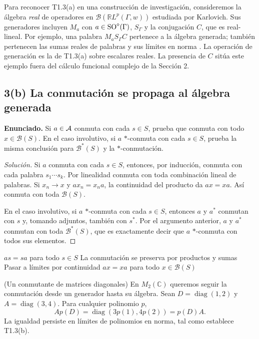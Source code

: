 \begin{investigacion}[title={Generación de un álgebra real de operadores}]
Para reconocer T1.3(a) en una construcción de investigación, consideremos la álgebra
\emph{real} de operadores en $\mathcal B(\mathbb R L^p(\Gamma,w))$ estudiada por Karlovich.
Sus generadores incluyen $M_a$ con $a\in\operatorname{SO}^\diamond(\Gamma)$, $S_\Gamma$ y la
conjugación $C$, que es real-lineal. Por ejemplo, una palabra $M_aS_\Gamma C$ pertenece
a la álgebra generada; también pertenecen las sumas reales de palabras y sus límites en
norma \cite[ec.~(1.4), p.~3]{Karlovich2025}.
La operación de generación es la de T1.3(a) sobre escalares reales. La presencia de $C$
sitúa este ejemplo fuera del cálculo funcional complejo de la Sección 2.
\end{investigacion}

\subsection*{3(b) La conmutación se propaga al álgebra generada}

\noindent\textbf{Enunciado.} Si $a\in\mathcal A$ conmuta con cada $s\in S$, prueba que conmuta con todo $x\in\mathcal B(S)$. En el caso involutivo, si $a$ $*$-conmuta con cada $s\in S$, prueba la misma conclusión para $\mathcal B^*(S)$ y la $*$-conmutación.

\begin{proof}[Solución]
Si $a$ conmuta con cada $s\in S$, entonces, por inducción, conmuta con cada palabra
$s_1\cdots s_k$. Por linealidad conmuta con toda combinación lineal de palabras. Si
$x_n\to x$ y $ax_n=x_na$, la continuidad del producto da $ax=x a$. Así conmuta con toda
$\mathcal B(S)$.

En el caso involutivo, si $a$ $*$-conmuta con cada $s\in S$, entonces $a$ y $a^*$ conmutan con
$s$ y, tomando adjuntos, también con $s^*$. Por el argumento anterior, $a$ y $a^*$ conmutan con
toda $\mathcal B^*(S)$, que es exactamente decir que $a$ $*$-conmuta con todos sus elementos.
\end{proof}

\proofdiagram
{$as=sa$ para todo $s\in S$}
{La conmutación se preserva por productos y sumas}
{Pasar a límites por continuidad}
{$ax=xa$ para todo $x\in\mathcal B(S)$}

\begin{cthejemplo}{(Un conmutante de matrices diagonales)}
En $M_2(\mathbb C)$ queremos seguir la conmutación desde un generador hasta su álgebra.
Sean $D=\operatorname{diag}(1,2)$ y $A=\operatorname{diag}(3,4)$.
Para cualquier polinomio $p$,
\[
 Ap(D)=\operatorname{diag}(3p(1),4p(2))=p(D)A.
\]
La igualdad persiste en límites de polinomios en norma, tal como establece T1.3(b).
\end{cthejemplo}

